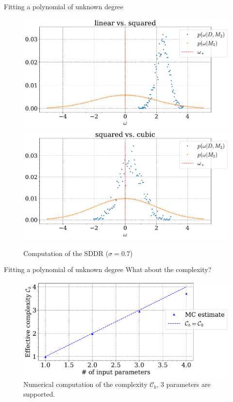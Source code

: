\documentclass[11pt,aspectratio=1610,dvipsnames]{beamer}
\begin{document}
\begin{frame}{Fitting a polynomial of unknown degree}
\begin{minipage}{.49\linewidth}
	\end{minipage}
	\hfill
	\begin{minipage}{.49\linewidth}
		\begin{figure}[H]
			\centering
			\includegraphics[width=\linewidth]{SDDR_linear vs. squared_sigma_07a+.pdf}
			\includegraphics[width=\linewidth]{SDDR_squared vs. cubic_sigma_07a+.pdf}
			\caption{Computation of the SDDR  ($\sigma=0.7$)}
			\label{fig:sddr}
		\end{figure}
	\end{minipage}

\end{frame}
\begin{frame}{Fitting a polynomial of unknown degree}
	What about the complexity?
	\begin{figure}
		\centering
		\includegraphics[width=\linewidth]{_sigma_07acomplexity.pdf}
		\caption{Numerical computation of the complexity $\mathcal{C}_b$, 3 parameters are supported.}
	\end{figure}
\end{frame}
\end{document}
